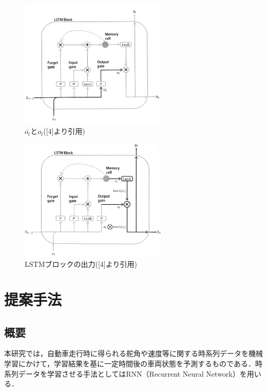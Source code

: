 \documentclass[twocolumn]{jsarticle}
\begin{document}
\begin{figure}[H]
	\centering
	\includegraphics[width=7cm]{output_gate.jpg}
	\caption{$\overline{o_t}$と$o_t$([4]より引用)}
	\label{fig13}
\end{figure}

\begin{figure}[H]
	\centering
	\includegraphics[width=7cm]{output.jpg}
	\caption{LSTMブロックの出力([4]より引用)}
	\label{fig14}
\end{figure}

\section{提案手法}
\subsection{概要}
本研究では，自動車走行時に得られる舵角や速度等に関する時系列データを機械学習にかけて，学習結果を基に一定時間後の車両状態を予測するものである．時系列データを学習させる手法としてはRNN（Recurrent Neural Network）を用いる．
\end{document}
